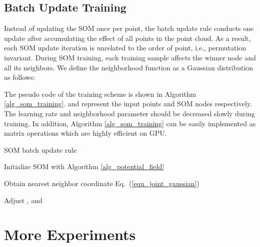 \documentclass[10pt,twocolumn,letterpaper]{article}
\begin{document}
\subsection{Batch Update Training}
Instead of updating the SOM once per point, the batch update rule conducts one update after accumulating the effect of all points in the point cloud. As a result, each SOM update iteration is unrelated to the order of point, i.e., permutation invariant. During SOM training, each training sample affects the winner node and all its neighbors. We define the neighborhood function as a Gaussian distribution as follows:



The pseudo code of the training scheme is shown in Algorithm \ref{alg_som_training}.  and  represent the input points and SOM nodes respectively. The learning rate  and neighborhood parameter  should be decreased slowly during training. In addition, Algorithm \ref{alg_som_training} can be easily implemented as matrix operations which are highly efficient on GPU.




\begin{algorithm}
\caption{SOM batch update rule} \label{alg_som_training}
\begin{algorithmic}
\State Initialize  SOM  with Algorithm \ref{alg_potential_field}
\For{}
    \State {}
    \ForAll{  }
        \State 
    \EndFor
    
    \State {}
    \ForAll{  }
        \State Obtain nearest neighbor coordinate 
        \ForAll{  }
            \State  Eq.~(\ref{equ_joint_gaussian})
            \State 
        \EndFor
    \EndFor
    
    \State {}
    \ForAll{  }
        \State 
    \EndFor
    \State 
    \State Adjust ,  and 
\EndFor
\end{algorithmic}
\end{algorithm}



\section{More Experiments} \label{sec_more_exps}
\end{document}
